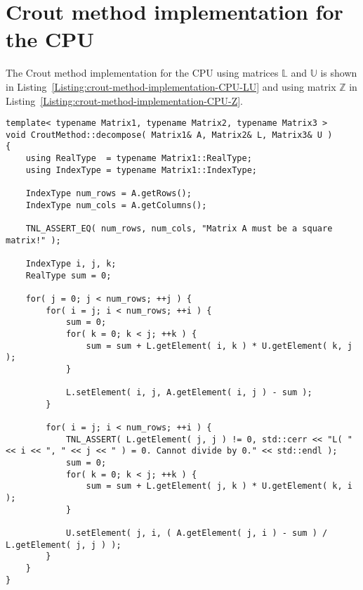 \chapter{Crout method implementation for the CPU}\label{Attachment:crout-method-implementation-CPU}
The Crout method implementation for the CPU using matrices $ \mathbb{L} $ and $ \mathbb{U} $ is shown in Listing~\ref{Listing:crout-method-implementation-CPU-LU} and using matrix $ \mathbb{Z} $ in Listing~\ref{Listing:crout-method-implementation-CPU-Z}.
\begin{lstlisting}[language={},caption={Implementation of the Crout method on the CPU using matrices $ \mathbb{L} $ and $ \mathbb{U} $. All matrix and variable types are obtained from template arguments of the method. Taken from the Decomposition project repository on GitLab\protect\footref{Footnote:decomposition-project-gitlab-url}.},label={Listing:crout-method-implementation-CPU-LU}]
template< typename Matrix1, typename Matrix2, typename Matrix3 >
void CroutMethod::decompose( Matrix1& A, Matrix2& L, Matrix3& U )
{
	using RealType  = typename Matrix1::RealType;
	using IndexType = typename Matrix1::IndexType;
	
	IndexType num_rows = A.getRows();
	IndexType num_cols = A.getColumns();
	
	TNL_ASSERT_EQ( num_rows, num_cols, "Matrix A must be a square matrix!" );
	
	IndexType i, j, k;
	RealType sum = 0;
	
	for( j = 0; j < num_rows; ++j )	{
		for( i = j; i < num_rows; ++i ) {
			sum = 0;
			for( k = 0; k < j; ++k ) {
				sum = sum + L.getElement( i, k ) * U.getElement( k, j );
			}
		
			L.setElement( i, j, A.getElement( i, j ) - sum );
		}
		
		for( i = j; i < num_rows; ++i ) {
			TNL_ASSERT( L.getElement( j, j ) != 0, std::cerr << "L( " << i << ", " << j << " ) = 0. Cannot divide by 0." << std::endl );
			sum = 0;
			for( k = 0; k < j; ++k ) {
				sum = sum + L.getElement( j, k ) * U.getElement( k, i );
			}
		
			U.setElement( j, i, ( A.getElement( j, i ) - sum ) / L.getElement( j, j ) );
		}
	}	
}
\end{lstlisting}

